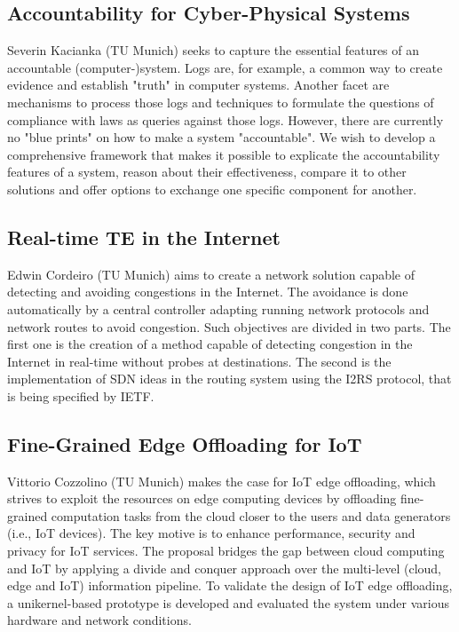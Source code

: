 \subsection{Accountability for Cyber-Physical Systems}

Severin Kacianka (TU Munich) seeks to capture the essential features of an
accountable (computer-)system.  Logs are, for example, a common way to create
evidence and establish  "truth" in computer systems. Another facet are
mechanisms to process those logs and techniques to formulate the questions of
compliance with laws as queries against those logs.  However, there are
currently no "blue prints" on how to make a system "accountable". We wish to
develop a comprehensive framework that makes it possible to explicate the
accountability features of a system, reason about their effectiveness, compare
it to other solutions and offer options to exchange one specific component for
another.


\subsection{Real-time TE in the Internet}

Edwin Cordeiro (TU Munich) aims to create a network solution capable of
detecting and avoiding congestions in the Internet. The avoidance is done
automatically by a central controller adapting running network protocols and
network routes to avoid congestion.  Such objectives are divided in two parts.
The first one is the creation of a method capable of detecting congestion in
the Internet in real-time without probes at destinations. The second is the
implementation of \ac{SDN} ideas in the routing system using the \ac{I2RS}
protocol, that is being specified by \ac{IETF}.

\subsection{Fine-Grained Edge Offloading for IoT}

Vittorio Cozzolino (TU Munich) makes the case for \ac{IoT} edge offloading,
which strives to exploit the resources on edge computing devices by offloading
fine-grained computation tasks from the cloud closer to the users and data
generators (i.e., IoT devices). The key motive is to enhance performance,
security and privacy for IoT services. The proposal bridges the gap between
cloud computing and IoT by applying a divide and conquer approach over the
multi-level (cloud, edge and IoT) information pipeline.  To validate the
design of IoT edge offloading, a unikernel-based prototype is developed and
evaluated the system under various hardware and network conditions.

